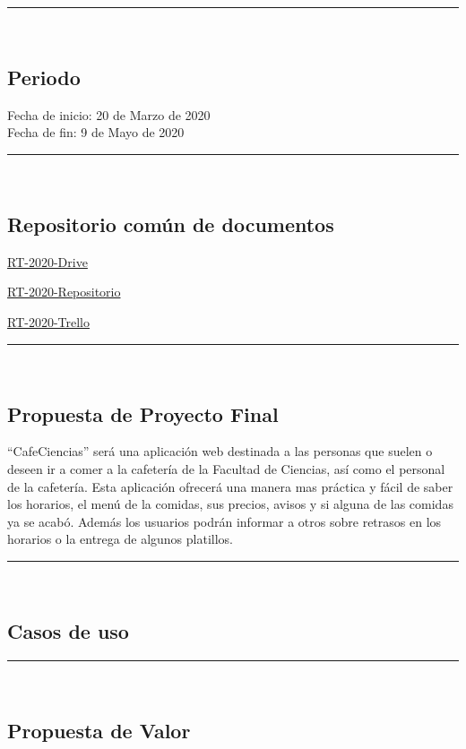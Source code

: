 \documentclass{article}
\begin{document}
\rule{0.8\textwidth}{.8pt}\\

\subsection*{Periodo}
Fecha de inicio: 20 de Marzo de 2020\\
\indent Fecha de fin: 9 de Mayo de 2020\\


\rule{0.8\textwidth}{.8pt}\\

\subsection*{Repositorio común de documentos}
\href{https://drive.google.com/open?id=13f9jp3Oli6AQF1Ap8VhoEKFXTPULumos}{RT-2020-Drive}

\href{https://github.com/mildewyPrawn/CafeCiencias}{RT-2020-Repositorio}

\href{https://trello.com/b/rwdAGuSi/cafeciencias}{RT-2020-Trello}

\rule{0.8\textwidth}{.8pt}\\

\subsection*{Propuesta de Proyecto Final}

“CafeCiencias” será una aplicación web destinada a las personas que suelen o
deseen ir a comer a la cafetería de la Facultad de Ciencias, así como el personal
de la cafetería. Esta aplicación ofrecerá una manera mas práctica y fácil de
saber los horarios, el menú de la comidas, sus precios, avisos y si alguna de las
comidas ya se  acabó. Además los usuarios podrán informar a otros sobre retrasos
en los horarios o la entrega de algunos platillos.

\rule{0.8\textwidth}{.8pt}\\

\subsection*{Casos de uso}

\rule{0.8\textwidth}{.8pt}\\

\subsection*{Propuesta de Valor}
\end{document}
